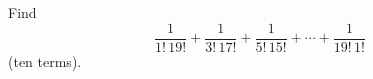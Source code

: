 Find
\[
\dfrac{1}{1!\,19!}+\dfrac{1}{3!\,17!}+\dfrac{1}{5!\,15!}+\cdots+\dfrac{1}{19!\,1!}
\]
(ten terms).
